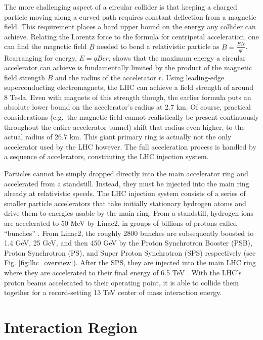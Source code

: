     The more challenging aspect of a circular collider is that keeping a charged particle moving along a curved path requires constant deflection from a magnetic field.
    This requirement places a hard upper bound on the energy any collider can achieve.
    Relating the Lorentz force to the formula for centripetal acceleration,
        one can find the magnetic field $B$ needed to bend a relativistic particle as $B=\frac{E/c}{q r}$.
    Rearranging for energy, $E = q B c r$, shows that the maximum energy a circular accelerator can achieve is fundamentally limited by the product of the magnetic field strength $B$ and the radius of the accelerator $r$.
    Using leading-edge superconducting electromagnets, the LHC can achieve a field strength of around 8 Tesla.
    Even with magnets of this strength though, the earlier formula puts an absolute lower bound on the accelerator's radius at 2.7 km.
    Of course, practical considerations (e.g.\ the magnetic field cannot realistically be present continuously throughout the entire accelerator tunnel) shift that radius even higher, to the actual radius of 26.7 km.
    This giant primary ring is actually not the only accelerator used by the LHC however.
    The full acceleration process is handled by a sequence of accelerators, constituting the LHC injection system.

    Particles cannot be simply dropped directly into the main accelerator ring and accelerated from a standstill.
    Instead, they must be injected into the main ring already at relativistic speeds.
    The LHC injection system consists of a series of smaller particle accelerators
        that take initially stationary hydrogen atoms and drive them to energies usable by the main ring.
    From a standstill, hydrogen ions are accelerated to 50 MeV by Linac2, in groups of billions of protons called ``bunches'' \cite{lhc_run2}.
    From Linac2, the roughly 2800 bunches are subsequently boosted to 1.4 GeV, 25 GeV, and then 450 GeV by the Proton Synchrotron Booster (PSB), Proton Synchrotron (PS), and Super Proton Synchrotron (SPS) respectively (see Fig. \ref{fig:lhc_overview}).
    After the SPS, they are injected into the main LHC ring where they are accelerated to their final energy of 6.5 TeV \cite{lhc_machine}.
    With the LHC's proton beams accelerated to their operating point, it is able to collide them together for a record-setting 13 TeV center of mass interaction energy.


\section{Interaction Region} \label{sec:lhc-interaction_region}

